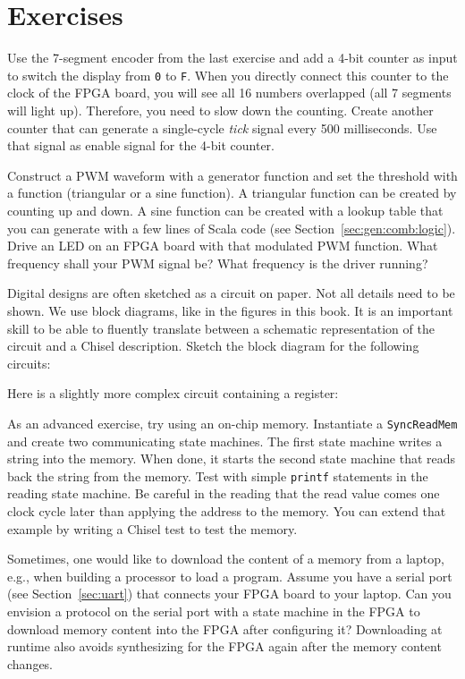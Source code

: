 \documentclass[%
    10pt,
    headinclude, footinclude=false,
    openright, %
    notitlepage,
    cleardoublepage=empty,
    headsepline,
    numbers=noenddot,
    bibliography=totoc, index=totoc,
    ]{scrbook}
\newcommand{\code}[1]{{\lstinline[basicstyle=\small\ttfamily]{#1}}}
\begin{document}
\section{Exercises}

Use the 7-segment encoder from the last exercise and add a 4-bit counter as input
to switch the display from \code{0} to \code{F}. When you directly connect this
counter to the clock of the FPGA board, you will see all 16 numbers
overlapped (all 7 segments will light up).
Therefore, you need to slow down the counting. Create another
counter that can generate a single-cycle \emph{tick} signal every 500 milliseconds.
Use that signal as enable signal for the 4-bit counter.

Construct a PWM waveform with a generator function and set the threshold with a
function (triangular or a sine function).
A triangular function can be created by counting up and down. A sine function can be created with
a lookup table that you can generate with a few lines of Scala code
(see Section~\ref{sec:gen:comb:logic}).
Drive an LED on an FPGA board with that modulated PWM function. What frequency shall your
PWM signal be? What frequency is the driver running?

Digital designs are often sketched as a circuit on paper. Not all details need to be shown.
We use block diagrams, like in the figures in this book. It is an important skill to be able
to fluently translate between a schematic representation of the circuit and a Chisel description.
Sketch the block diagram for the following circuits:


\noindent Here is a slightly more complex circuit containing a register:


As an advanced exercise, try using an on-chip memory. Instantiate a \code{SyncReadMem}
and create two communicating state machines. The first state machine writes a string
into the memory. When done, it starts the second state machine that reads back
the string from the memory. Test with simple \code{printf} statements in the
reading state machine. Be careful in the reading that the read value comes one clock cycle
later than applying the address to the memory.
You can extend that example by writing a Chisel test to test the memory.

Sometimes, one would like to download the content of a memory from a laptop,
e.g., when building a processor to load a program. Assume you have a
serial port (see Section~\ref{sec:uart}) that connects your FPGA
board to your laptop. Can you envision a protocol on the serial port
with a state machine in the FPGA to download memory content into
the FPGA after configuring it? Downloading at runtime also avoids synthesizing
for the FPGA again after the memory content changes.
\end{document}
